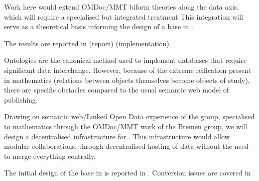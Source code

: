 \begin{workpackage}[id=dksbases,%
  title=Data/Knowledge/Software-Bases,lead=JU,
  ZHRM=12,JURM=36,UWRM=25,SARM=10,LLRM=2,PSRM=4]
\begin{tasklist}
\begin{task}[title=Triform Theories in OMDoc/MMT,id=data-triform,
  lead=JU,partners={ZH},PM=12,wphases=0-12]
  Work here would extend OMDoc/MMT biform theories along the data axis, which will require
  a specialised but integrated treatment This integration will serve as a theoretical
  basis informing the design of a \DKS base in .

  The results are reported in  (report) 
  (implementation).
\end{task}

\begin{task}[id=data-design,lead=JU,partners={ZH,US,SA,UW,LL},wphases={6-12,15-18!.33},PM=12,
  title={\DKS Base Design}]
  Ontologies are the canonical method used to implement databases that require significant
  data interchange. However, because of the extreme reification present in mathematics
  (relations between objects themselves become objects of study), there are specific
  obstacles compared to the usual semantic web model of publishing.

  Drawing on semantic web/Linked Open Data experience of the  group, specialised
  to mathematics through the OMDoc/MMT work of the Bremen group, we will design a
  decentralised infrastructure for \TheProject. This infrastructure would allow modular
  collaborations, through decentralised hosting of data without the need to merge
  everything centrally.
  
  The initial design of the \DKS base in \TheProject is reported in
  . Conversion issues are covered in 
\end{task}

\begin{task}[title=Computational Foundation for Python/Sage,
  id=data-foundationCAS,lead=JU,partners={ZH,SA},PM=9,wphases=6-18!.66]


\end{task}
\end{tasklist}
\end{workpackage}
